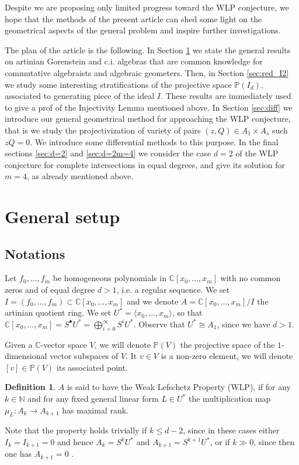 \documentclass[10pt, a4paper]{amsart}
\theoremstyle{plain}
\theoremstyle{definition}
\newtheorem{definition}{Definition}
\theoremstyle{remark}
\def\C{\mathbb{C}}
\def\PP{\mathbb{P}}
\begin{document}
Despite we are proposing only limited progress toward the WLP conjecture, we hope that the methods of the present article can shed some light on the geometrical aspects of the general problem and inspire further investigations.

The plan of the article is the following. In Section \ref{sec:setup} we state the general results on artinian Gorenstein and c.i. algebras that are common knowledge for commutative algebraists and algebraic geometers. 
 Then, in Section \ref{sec:red_I2} we study some interesting stratifications of the projective space $\PP(I_d)$, associated to generating piece of the ideal $I$. These results are immediately used to give a prof of the Injectivity Lemma mentioned above.
 In Section \ref{sec:diff} we introduce our general geometrical method for approaching the WLP conjecture, that is we study the projectivization of variety of pairs $(z,Q)\in A_1\times A_s$ such $zQ=0$. We introduce some differential methods to this purpose. In the final sections \ref{sec:d=2} and \ref{sec:d=2m=4} we consider the case $d=2$ of the WLP conjecture for complete intersections in equal degrees, and give its solution for $m=4$, as already mentioned above. 
\section{General setup}\label{sec:setup}
\subsection*{Notations} Let $f_0,\ldots,f_m$ be homogeneous polynomials in $\C[x_0,\ldots,x_m]$ with no common zeros and of equal degree $d>1$, i.e. a regular sequence. 
 We set $I= (f_0,\ldots,f_m)\subset\C[x_0,\ldots,x_m]$ and we denote $A=\C[x_0,\ldots,x_m]/I$ the artinian quotient ring.  We set $U^\ast=\langle x_0,\ldots,x_m\rangle$, so that $\C[x_0,\ldots,x_m]=S^\bullet U^\ast=\bigoplus_{i=0}^\infty S^iU^\ast$. Observe that $U^\ast\cong A_1$, since we have $d>1$.
 
 Given a $\C$-vector space $V$, we will denote $\PP(V)$ the projective space of the $1$-dimensional vector subspaces of $V$. It $v\in V$ is a non-zero element, we will denote $[v]\in\PP(V)$ its associated point.
\begin{definition}\label{def:WLP} $A$ is said to have the Weak Lefschetz Property (WLP), if for any $k\in \mathbb{N}$ and for any fixed general linear form $L\in U^\ast$ the multiplication map $\mu_L\colon A_{k}\longrightarrow A_{k+1}$ has maximal rank. \end{definition}
Note that the property holds trivially if $k\leq d-2$, since in these cases either $I_{k}=I_{k+1}=0$ and hence $A_k=S^kU^\ast$ and $A_{k+1}=S^{k+1}U^\ast$, or if $k\gg 0$, since then one has $A_{k+1}=0$ . 
 
\end{document}

